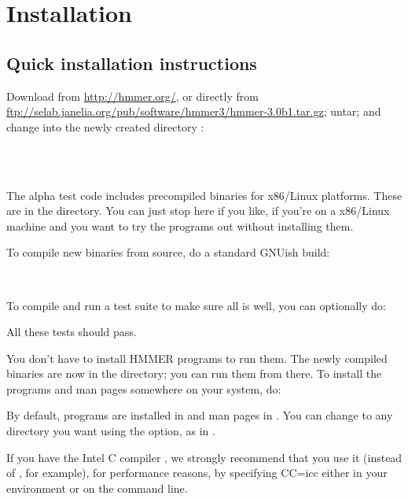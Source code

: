 \section{Installation}
\label{section:installation}

\subsection{Quick installation instructions}

Download  from
\url{http://hmmer.org/}, or directly from
\url{ftp://selab.janelia.org/pub/software/hmmer3/hmmer-3.0b1.tar.gz};
untar; and change into the newly created directory :

\\
\\

The alpha test code includes precompiled binaries for x86/Linux
platforms. These are in the  directory. You can just
stop here if you like, if you're on a x86/Linux machine and you want
to try the programs out without installing them.

To compile new binaries from source, do a standard GNUish build:

\\ 

To compile and run a test suite to make sure all is well, you can
optionally do:


All these tests should pass.

You don't have to install HMMER programs to run them. The newly
compiled binaries are now in the  directory; you can run
them from there. To install the programs and man pages somewhere on
your system, do:


By default, programs are installed in  and man
pages in . You can change 
to any directory you want using the 
option, as in .

If you have the Intel C compiler , we strongly recommend
that you use it (instead of , for example), for performance
reasons, by specifying {CC=icc} either in your environment or on the
 command line. 


